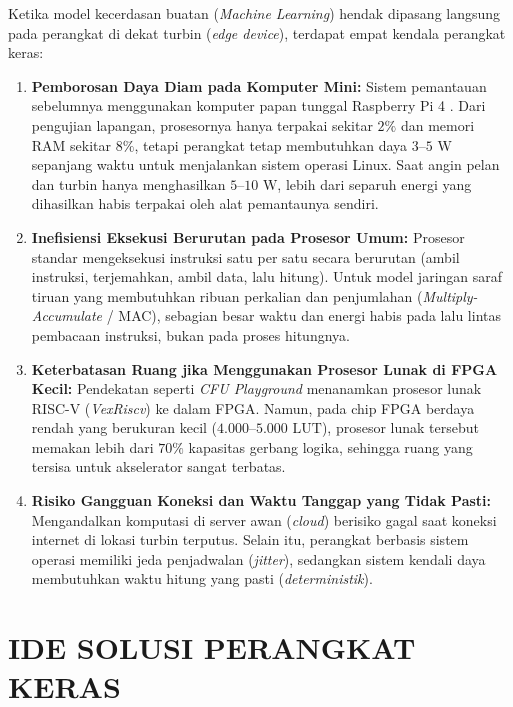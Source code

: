 \documentclass[12pt,a4paper]{article}
\begin{document}
Ketika model kecerdasan buatan (\textit{Machine Learning}) hendak dipasang langsung pada perangkat di dekat turbin (\textit{edge device}), terdapat empat kendala perangkat keras:

\begin{enumerate}[leftmargin=0.7cm, itemsep=3pt]
    \item \textbf{Pemborosan Daya Diam pada Komputer Mini:}
    Sistem pemantauan sebelumnya menggunakan komputer papan tunggal Raspberry Pi 4 \cite{hartanto2026}. Dari pengujian lapangan, prosesornya hanya terpakai sekitar $2\%$ dan memori RAM sekitar $8\%$, tetapi perangkat tetap membutuhkan daya $3\text{--}5\text{ W}$ sepanjang waktu untuk menjalankan sistem operasi Linux. Saat angin pelan dan turbin hanya menghasilkan $5\text{--}10\text{ W}$, lebih dari separuh energi yang dihasilkan habis terpakai oleh alat pemantaunya sendiri.

    \item \textbf{Inefisiensi Eksekusi Berurutan pada Prosesor Umum:}
    Prosesor standar mengeksekusi instruksi satu per satu secara berurutan (ambil instruksi, terjemahkan, ambil data, lalu hitung). Untuk model jaringan saraf tiruan yang membutuhkan ribuan perkalian dan penjumlahan (\textit{Multiply-Accumulate} / MAC), sebagian besar waktu dan energi habis pada lalu lintas pembacaan instruksi, bukan pada proses hitungnya.

    \item \textbf{Keterbatasan Ruang jika Menggunakan Prosesor Lunak di FPGA Kecil:}
    Pendekatan seperti \textit{CFU Playground} \cite{prakash2023} menanamkan prosesor lunak RISC-V (\textit{VexRiscv}) ke dalam FPGA. Namun, pada chip FPGA berdaya rendah yang berukuran kecil ($4.000\text{--}5.000\text{ LUT}$), prosesor lunak tersebut memakan lebih dari $70\%$ kapasitas gerbang logika, sehingga ruang yang tersisa untuk akselerator sangat terbatas.

    \item \textbf{Risiko Gangguan Koneksi dan Waktu Tanggap yang Tidak Pasti:}
    Mengandalkan komputasi di server awan (\textit{cloud}) berisiko gagal saat koneksi internet di lokasi turbin terputus. Selain itu, perangkat berbasis sistem operasi memiliki jeda penjadwalan (\textit{jitter}), sedangkan sistem kendali daya membutuhkan waktu hitung yang pasti (\textit{deterministik}).
\end{enumerate}

\section{IDE SOLUSI PERANGKAT KERAS}
\end{document}
